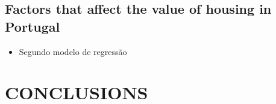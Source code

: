 \documentclass{aip-cp}
\begin{document}
    











\subsection{Factors that affect the value of housing in Portugal}

\begin{itemize}
    \item Segundo modelo de regressão
\end{itemize}



\section{\uppercase{Conclusions}}
\end{document}
